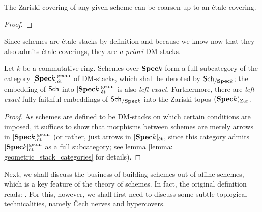                 \begin{lemma} \label{lemma: etale_coverings_of_schemes}
                    The Zariski covering of any given scheme can be coarsen up to an \'etale covering. 
                \end{lemma}
                    \begin{proof}
                        
                    \end{proof}
                \begin{corollary} \label{coro: schemes_are_DM_stacks}
                    Since schemes are \'etale stacks by definition and because we know now that they also admits \'etale coverings, they are \textit{a priori} DM-stacks.
                \end{corollary}
                \begin{theorem} \label{theorem: scheme_categories} 
                    Let $k$ be a commutative ring. Schemes over $\mathbf{Spec} k$ form a full subcategory of the category $[\mathbf{Spec} k]^{\mathrm{geom}}_{\mathrm{\acute{e}t}}$ of DM-stacks, which shall be denoted by $\mathsf{Sch}_{/\mathbf{Spec} k}$; the embedding of $\mathsf{Sch}$ into $[\mathbf{Spec} k]^{\mathrm{geom}}_{\mathrm{\acute{e}t}}$ is also \textit{left-exact}. Furthermore, there are \textit{left-exact} fully faithful embeddings of $\mathsf{Sch}_{/\mathbf{Spec} k}$ into the Zariski topos $(\mathbf{Spec} k)_{\mathrm{Zar}}$.
                \end{theorem}
                    \begin{proof}
                        As schemes are defined to be DM-stacks on which certain conditions are imposed, it suffices to show that morphisms between schemes are merely arrows in $[\mathbf{Spec} k]^{\mathrm{geom}}_{\mathrm{\acute{e}t}}$ (or rather, just arrows in $[\mathbf{Spec} k]_{\mathrm{\acute{e}t}}$, since this category admits $[\mathbf{Spec} k]^{\mathrm{geom}}_{\mathrm{\acute{e}t}}$ as a full subcategory; see lemma \ref{lemma: geometric_stack_categories} for details).
                    \end{proof}
                
                Next, we shall discuss the business of building schemes out of affine schemes, which is a key feature of the theory of schemes. In fact, the original definition reads: . For this, however, we shall first need to discuss some subtle toplogical technicalities, namely \v{C}ech nerves and hypercovers.
                
